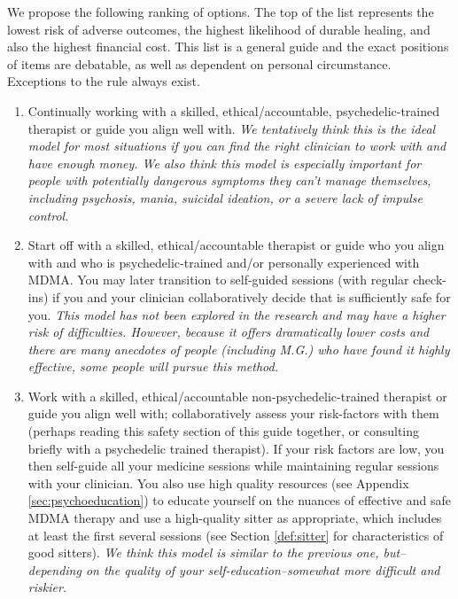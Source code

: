 \documentclass[12pt,letterpaper]{book}
\begin{document}
We propose the following ranking of options. The top of the list represents the lowest risk of adverse outcomes, the highest likelihood of durable healing, and also the highest financial cost. This list is a general guide and the exact positions of items are debatable, as well as dependent on personal circumstance. Exceptions to the rule always exist.
\begin{enumerate}
    \item Continually working with a skilled, ethical/accountable, psychedelic-trained therapist or guide you align well with. \textit{We tentatively think this is the ideal model for most situations if you can find the right clinician to work with and have enough money. We also think this model is especially important for people with potentially dangerous symptoms they can't manage themselves, including psychosis, mania, suicidal ideation, or a severe lack of impulse control.}
    \item Start off with a skilled, ethical/accountable therapist or guide who you align with and who is psychedelic-trained and/or personally experienced with MDMA. You may later transition to self-guided sessions (with regular check-ins) if you and your clinician collaboratively decide that is sufficiently safe for you. \textit{This model has not been explored in the research and may have a higher risk of difficulties. However, because it offers dramatically lower costs and there are many anecdotes of people (including M.G.) who have found it highly effective, some people will pursue this method.}
    \item Work with a skilled, ethical/accountable non-psychedelic-trained therapist or guide you align well with; collaboratively assess your risk-factors with them (perhaps reading this safety section of this guide together, or consulting briefly with a psychedelic trained therapist). If your risk factors are low, you then self-guide all your medicine sessions while maintaining regular sessions with your clinician. You also use high quality resources (see Appendix \ref{sec:psychoeducation}) to educate yourself on the nuances of effective and safe MDMA therapy and use a high-quality sitter as appropriate, which includes at least the first several sessions (see Section \ref{def:sitter} for characteristics of good sitters). \textit{We think this model is similar to the previous one, but–depending on the quality of your self-education–somewhat more difficult and riskier.}

\end{enumerate}
\end{document}
